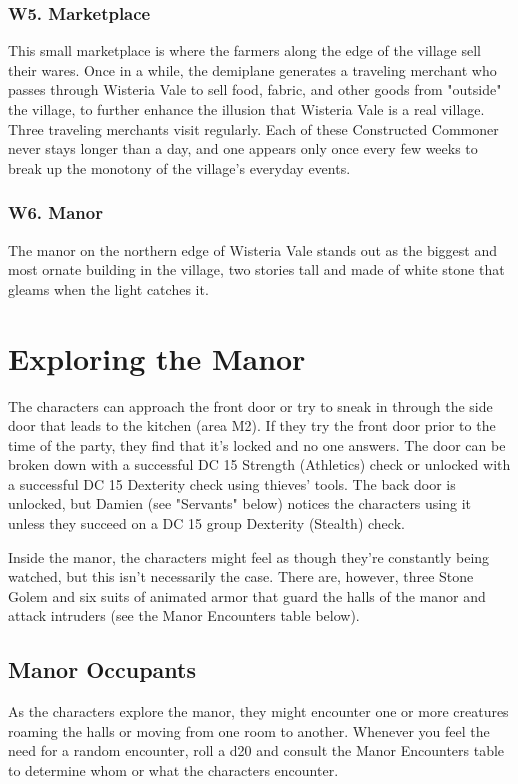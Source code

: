 \documentclass[10pt,a4paper,twoside,bg=print,twocolumn,openany,nodeprecatedcode]{dndbook}
\begin{document}
\subsubsection{W5. Marketplace}
This small marketplace is where the farmers along the edge of the village sell their wares. Once in a while, the demiplane generates a traveling merchant who passes through Wisteria Vale to sell food, fabric, and other goods from "outside" the village, to further enhance the illusion that Wisteria Vale is a real village. Three traveling merchants visit regularly. Each of these Constructed Commoner never stays longer than a day, and one appears only once every few weeks to break up the monotony of the village's everyday events.

\subsubsection{W6. Manor}
The manor on the northern edge of Wisteria Vale stands out as the biggest and most ornate building in the village, two stories tall and made of white stone that gleams when the light catches it.

\section{Exploring the Manor}
The characters can approach the front door or try to sneak in through the side door that leads to the kitchen (area M2). If they try the front door prior to the time of the party, they find that it's locked and no one answers. The door can be broken down with a successful DC 15 Strength (Athletics) check or unlocked with a successful DC 15 Dexterity check using thieves' tools. The back door is unlocked, but Damien (see "Servants" below) notices the characters using it unless they succeed on a DC 15 group Dexterity (Stealth) check.

Inside the manor, the characters might feel as though they're constantly being watched, but this isn't necessarily the case. There are, however, three Stone Golem and six suits of animated armor that guard the halls of the manor and attack intruders (see the Manor Encounters table below).

\subsection{Manor Occupants}
As the characters explore the manor, they might encounter one or more creatures roaming the halls or moving from one room to another. Whenever you feel the need for a random encounter, roll a d20 and consult the Manor Encounters table to determine whom or what the characters encounter.
\end{document}
